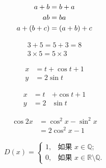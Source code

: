 \documentclass{ctexart}
\begin{document}
    \begin{gather}
        a+b=b+a \\
        ab = ba \notag \\ %
        a+(b+c)=(a+b)+c
    \end{gather}

    \begin{gather*}
        3+5 = 5+3 = 8 \\
        3 \times 5 = 5 \times 3
    \end{gather*}

    \begin{align}
        x & = t+\cos t + 1 \\
        y & = 2 \sin t
    \end{align}

    \begin{align*}
        x & = t&+\cos t + 1 \\
        y & = 2 &\sin t
    \end{align*}

    \begin{equation}
        \begin{split}
            \cos 2x &= \cos^2 x -\sin^2 x \\
            & = 2 \cos^2 x -1
        \end{split}
    \end{equation}

    \begin{equation}
        D(x)=\begin{cases}
            1,& \text{如果 } x \in \mathbb{Q}; \\
            0,& \text{如果 } x \in \mathbb{R}\setminus\mathbb{Q}.
        \end{cases}
    \end{equation}
\end{document}
